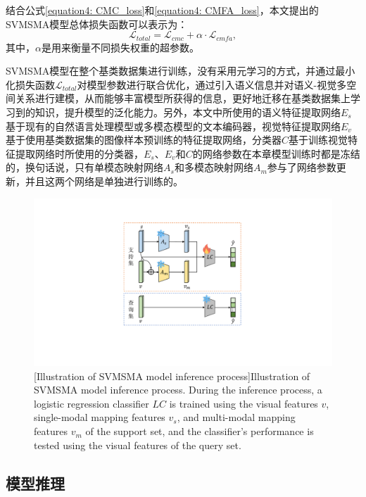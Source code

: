 结合公式\ref{equation4: CMC_loss}和\ref{equation4: CMFA_loss}，本文提出的SVMSMA模型总体损失函数可以表示为：
\begin{equation}
  \label{equation4: total_loss}
  \mathcal{L}_{total} = \mathcal{L}_{cmc} + \alpha \cdot \mathcal{L}_{cmfa},
\end{equation}
其中，$\alpha$是用来衡量不同损失权重的超参数。

SVMSMA模型在整个基类数据集进行训练，没有采用元学习的方式，并通过最小化损失函数$\mathcal{L}_{total}$对模型参数进行联合优化，通过引入语义信息并对语义-视觉多空间关系进行建模，从而能够丰富模型所获得的信息，更好地迁移在基类数据集上学习到的知识，提升模型的泛化能力。另外，本文中所使用的语义特征提取网络$E_s$基于现有的自然语言处理模型或多模态模型的文本编码器，视觉特征提取网络$E_v$基于使用基类数据集的图像样本预训练的特征提取网络，分类器$C$基于训练视觉特征提取网络时所使用的分类器，$E_s$、$E_v$和$C$的网络参数在本章模型训练时都是冻结的，换句话说，只有单模态映射网络$A_s$和多模态映射网络$A_m$参与了网络参数更新，并且这两个网络是单独进行训练的。

\begin{figure}[h!]
  \centering
  \includegraphics[width=0.6\columnwidth]{figures/SVMSMA/推理过程.pdf}
  [Illustration of SVMSMA model inference process]{Illustration of SVMSMA model inference process. During the inference process, a logistic regression classifier $LC$ is trained using the visual features $v$, single-modal mapping features $v_s$, and multi-modal mapping features $v_m$ of the support set, and the classifier's performance is tested using the visual features of the query set.}
  \label{figure4: 推理过程}
  \vspace{-7pt}
\end{figure}

\subsection[\hspace{-2pt}模型推理]{{\heiti{} \hspace{-8pt}模型推理}}\label{section4: 模型推理}

